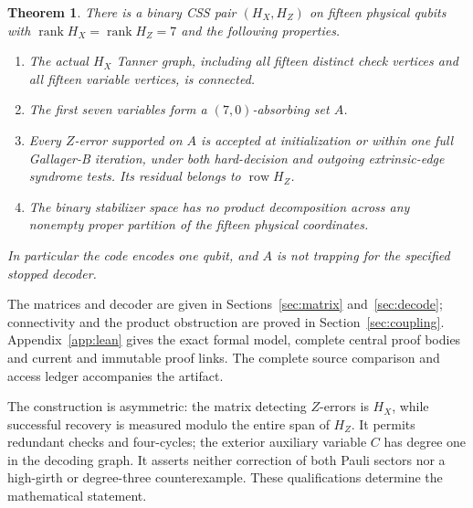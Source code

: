 \documentclass[11pt]{article}
\newtheorem{theorem}{Theorem}
\newcommand{\row}{\operatorname{row}}
\begin{document}
\begin{theorem}\label{thm:main}
There is a binary CSS pair $(H_X,H_Z)$ on fifteen physical qubits with
$\operatorname{rank}H_X=\operatorname{rank}H_Z=7$ and the following properties.
\begin{enumerate}
\item The actual $H_X$ Tanner graph, including all fifteen distinct check
vertices and all fifteen variable vertices, is connected.
\item The first seven variables form a $(7,0)$-absorbing set $A$.
\item Every $Z$-error supported on $A$ is accepted at initialization or
within one full Gallager-B iteration, under both hard-decision and outgoing
extrinsic-edge syndrome tests. Its residual belongs to $\row H_Z$.
\item The binary stabilizer space has no product decomposition across any
nonempty proper partition of the fifteen physical coordinates.
\end{enumerate}
In particular the code encodes one qubit, and $A$ is not trapping for the
specified stopped decoder.
\end{theorem}
The matrices and decoder are given in Sections~\ref{sec:matrix}
and~\ref{sec:decode}; connectivity and the product obstruction are proved
in Section~\ref{sec:coupling}. Appendix~\ref{app:lean} gives the exact formal
model, complete central proof bodies and current and immutable proof links.
The complete source comparison and access ledger accompanies the artifact.

The construction is asymmetric: the matrix detecting $Z$-errors is $H_X$,
while successful recovery is measured modulo the entire span of $H_Z$.
It permits redundant checks and four-cycles; the exterior auxiliary variable $C$ has degree one in the decoding graph. It asserts neither correction
of both Pauli sectors nor a high-girth or degree-three counterexample.
These qualifications determine the mathematical statement.
\end{document}
